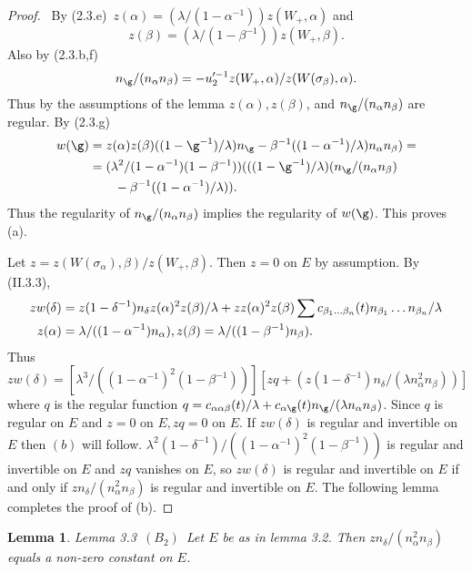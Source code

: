 \documentclass{memo-l}
\newtheorem{lemma}[theorem]{Lemma}
\theoremstyle{definition}
\theoremstyle{remark}
\numberwithin{section}{chapter}
\numberwithin{equation}{chapter}
\begin{document}
\begin{proof} \   By (2.3.e)\  $z({\alpha}) = ({\lambda}/(1-{\alpha}^{-1}))z(W_{+},
{\alpha})$ and $$z({\beta})=({\lambda}/(1-{\beta}^{-1}))z(W_{+},{\beta}).$$ 
 Also by (2.3.b,f)
$$ 
n_{{\g}}/(n_{\alpha}n_{\beta}) = -u_{2}^{\prime-1}z(W_{+},
{\alpha})/z(W({\sigma}_{\beta}),{\alpha}) .
$$
Thus by the assumptions of the lemma $z({\alpha}), z({\beta})$, and 
$n_{{\g}}/(n_{\alpha}n_{\beta})$ are regular. 
 By (2.3.g)
$$
\aligned
w({\g}) &= z({\alpha})z({\beta})((1-{\g}^{-1})/{\lambda})n_{{\g}} 
- {\beta}^{-1}((1-{\alpha}^{-1})/{\lambda})n_{\alpha}n_{\beta}) = \\
&= ({\lambda}^{2}/(1-{\alpha}^{-1})(1-{\beta}^{-1}))
(((1-{\g}^{-1})/{\lambda})(n_{{\g}}/(n_{\alpha}n_{\beta}) \\
&\quad\quad  - {\beta}^{-1}((1-{\alpha}^{-1})/{\lambda})).
\endaligned
$$ 
Thus the regularity of $n_{{\g}}/(n_{\alpha}n_{\beta})$ implies the 
regularity of $w({\g})$. 
 This proves (a).

   Let $z = z(W({\sigma}_{\alpha}),{\beta})/z(W_{+},{\beta})$. 
 Then $z = 0$ on $E$ by assumption. 
 By (II.3.3),
$$
\aligned
zw({\delta}) &= z(1-{\delta}^{-1})n_{{\delta}}z({\alpha})^{2}
z({\beta})/{\lambda} + zz({\alpha})^{2}z({\beta}) \sum
c_{\beta_1\ldots \beta_n}(t)n_{\beta_1}\ldots n_{\beta_n}/{\lambda}\\
z({\alpha}) &= {\lambda}/((1-{\alpha}^{-1})n_{\alpha}), 
z({\beta}) = {\lambda}/((1-{\beta}^{-1})n_{\beta}).
\endaligned
$$ 
Thus
$$
zw({\delta}) = [{\lambda}^{3}/((1-{\alpha}^{-1})^{2}(1-{\beta}^{-1}))][zq + 
(z(1-{\delta}^{-1})n_{{\delta}}/({\lambda}n_{\alpha}^{2}n_{\beta}))]
$$
where $q$ is the regular function $q = c_{{\alpha}{\alpha}{\beta}}(t)/{\lambda} 
+ c_{{\alpha}{\g}}(t)n_{{\g}}/({\lambda}n_{\alpha}n_{\beta})$.
Since $q$ is regular on $E$ and $z = 0$ on $E, zq = 0$ on $E$. 
If $zw({\delta})$ is regular and invertible on $E$ then $(b)$ will follow. 
$\lambda^2(1-\delta^{-1})/((1-{\alpha}^{-1})^{2}(1-\beta^{-1}))$ is
regular and invertible on $E$ and $zq$ vanishes on $E$, so $zw({\delta})$ is 
regular and invertible on $E$ if and only if $zn_{{\delta}}/(n_{\alpha}^{2}
n_{\beta})$ is regular and invertible on $E$. 
 The following lemma completes the proof of (b).
\end{proof}

\medskip

\begin{lemma}{Lemma 3.3}\   $(B_{2})$\  Let $E$ be as in lemma 3.2. 
 Then $zn_{{\delta}}/(n_{\alpha}^{2}n_{\beta})$ equals a non-zero constant 
on $E$.
\end{lemma}
\end{document}
